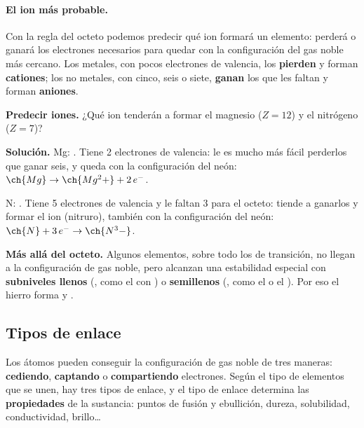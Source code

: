 \paragraph{El ion más probable.} Con la regla del octeto podemos predecir qué ion formará un elemento: perderá o ganará los
electrones necesarios para quedar con la configuración del gas noble más cercano. Los metales, con pocos electrones de valencia,
los \textbf{pierden} y forman \textbf{cationes}; los no metales, con cinco, seis o siete, \textbf{ganan} los que les faltan y
forman \textbf{aniones}.

\begin{example}
    \textbf{Predecir iones.} ¿Qué ion tenderán a formar el magnesio (\(Z = 12\)) y el nitrógeno (\(Z = 7\))?

    \textbf{Solución.} Mg: . Tiene 2 electrones de valencia: le es mucho más fácil perderlos que ganar
    seis, y queda con la configuración del neón: \(\ch{Mg} \rightarrow \ch{Mg^2+} + 2\,e^-\).

    N: . Tiene 5 electrones de valencia y le faltan 3 para el octeto: tiende a ganarlos y formar el ion
     (nitruro), también con la configuración del neón: \(\ch{N} + 3\,e^- \rightarrow \ch{N^3-}\).
\end{example}

\begin{remark}
    \textbf{Más allá del octeto.} Algunos elementos, sobre todo los de transición, no llegan a la configuración de gas noble,
    pero alcanzan una estabilidad especial con \textbf{subniveles llenos} (, como el  con
    ) o \textbf{semillenos} (, como el  o el ). Por eso el hierro forma
     y .
\end{remark}

\subsection{Tipos de enlace}

Los átomos pueden conseguir la configuración de gas noble de tres maneras: \textbf{cediendo}, \textbf{captando} o
\textbf{compartiendo} electrones. Según el tipo de elementos que se unen, hay tres tipos de enlace, y el tipo de enlace determina
las \textbf{propiedades} de la sustancia: puntos de fusión y ebullición, dureza, solubilidad, conductividad, brillo…

